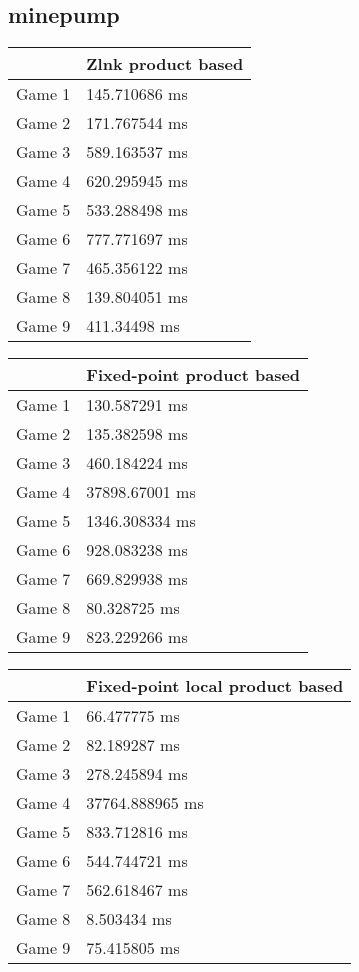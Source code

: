 \subsection{minepump}
\begin{tabular}{|l|l|}
	\hline
	& Zlnk product based \\ \hline
	Game 1 & 145.710686 ms \\ \hline
	Game 2 & 171.767544 ms \\ \hline
	Game 3 & 589.163537 ms \\ \hline
	Game 4 & 620.295945 ms \\ \hline
	Game 5 & 533.288498 ms \\ \hline
	Game 6 & 777.771697 ms \\ \hline
	Game 7 & 465.356122 ms \\ \hline
	Game 8 & 139.804051 ms \\ \hline
	Game 9 & 411.34498 ms \\ \hline
\end{tabular}
\begin{tabular}{|l|l|}
	\hline
	& Fixed-point product based \\ \hline
	Game 1 & 130.587291 ms \\ \hline
	Game 2 & 135.382598 ms \\ \hline
	Game 3 & 460.184224 ms \\ \hline
	Game 4 & 37898.67001 ms \\ \hline
	Game 5 & 1346.308334 ms \\ \hline
	Game 6 & 928.083238 ms \\ \hline
	Game 7 & 669.829938 ms \\ \hline
	Game 8 & 80.328725 ms \\ \hline
	Game 9 & 823.229266 ms \\ \hline
\end{tabular}
\begin{tabular}{|l|l|}
	\hline
	& Fixed-point local product based \\ \hline
	Game 1 & 66.477775 ms \\ \hline
	Game 2 & 82.189287 ms \\ \hline
	Game 3 & 278.245894 ms \\ \hline
	Game 4 & 37764.888965 ms \\ \hline
	Game 5 & 833.712816 ms \\ \hline
	Game 6 & 544.744721 ms \\ \hline
	Game 7 & 562.618467 ms \\ \hline
	Game 8 & 8.503434 ms \\ \hline
	Game 9 & 75.415805 ms \\ \hline
\end{tabular}
